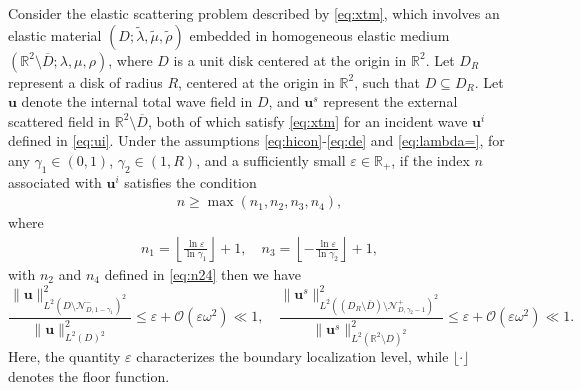 \documentclass[10pt,a4paper]{amsart}
\newcommand{\bu}{\mathbf{u}}
\begin{document}
\begin{thm}\label{thm:isl}
	Consider the elastic scattering problem described by \eqref{eq:xtm}, which involves an elastic material \(\left(D;\tilde{\lambda},\tilde{\mu},\tilde{\rho}\right)\) embedded in  homogeneous elastic medium \(\left(\mathbb{R}^2 \setminus \overline{D};\lambda,\mu,\rho\right)\), where \(D\) is a unit disk centered at the origin in \(\mathbb{R}^2\). Let \(D_R\) represent a disk of radius \(R\), centered at the origin in \(\mathbb{R}^2\), such that \(D \subseteq D_R\).  Let \(\bu\) denote the internal total wave field in \(D\), and  \(\bu^s\) represent the external scattered field in \(\mathbb{R}^2 \setminus \overline{D}\), both of which satisfy \eqref{eq:xtm} for an incident wave \(\bu^i\) defined in \eqref{eq:ui}. Under the assumptions \eqref{eq:hicon}-\eqref{eq:de} and \eqref{eq:lambda=}, for any \(\gamma_1 \in (0, 1)\), \(\gamma_2 \in (1, R)\), and a sufficiently small \(\varepsilon \in \mathbb{R}_+\), if the index \(n\) associated with \(\bu^i\) satisfies the condition 
	\begin{align}\label{eq:condition}
		n \geq \max(n_1, n_2, n_3, n_4),
	\end{align} where
	\begin{align}\label{eq:n13}
		n_1 = \left\lfloor\frac{\ln\varepsilon}{\ln\gamma_1}\right\rfloor + 1, \quad n_3 = \left\lfloor-\frac{\ln\varepsilon}{\ln\gamma_2}\right\rfloor + 1,
	\end{align}
	with $n_2$ and $n_4$ defined in \eqref{eq:n24}
	then we have
	$$
	\frac{\|\mathbf{u}\|_{L^2(D \setminus \mathcal{N}_{D,1-\gamma_{1}}^{-})^2}^2}{\|\mathbf{u}\|_{L^2(D)^2}^2} \leq \varepsilon + \mathcal{O}\left(\varepsilon\omega^2\right) \ll 1, \quad \frac{\|\mathbf{u}^s\|_{L^2(\left(D_R \setminus \overline{D}\right) \setminus \mathcal{N}_{D,\gamma_{2}-1}^{+})^2}^2}{\|\mathbf{u}^s\|_{L^2(\mathbb{R}^2 \setminus D)^2}^2} \leq \varepsilon + \mathcal{O}\left(\varepsilon\omega^2\right)  { \ll }  1.
	$$
	Here, the quantity \(\varepsilon\) characterizes the boundary localization level, while \(\lfloor \cdot \rfloor\) denotes the floor function. 
\end{thm}
\end{document}
